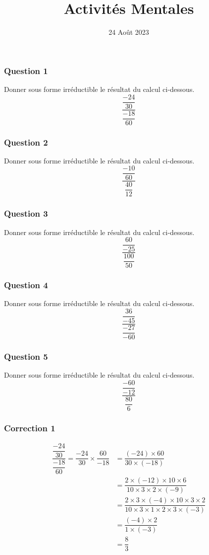 \documentclass[15pt, mathserif]{beamer}
\title{Activités Mentales}
\date{24 Août 2023}
\begin{document}
\begin{frame}
    \titlepage
\end{frame}

\begin{frame} 
	\frametitle{Question 1}
Donner sous forme irréductible le résultat du calcul ci-dessous. \[\dfrac{\dfrac{-24}{30}}{\dfrac{-18}{60}}\]\end{frame}


\begin{frame} 
	\frametitle{Question 2}
Donner sous forme irréductible le résultat du calcul ci-dessous. \[\dfrac{\dfrac{-10}{60}}{\dfrac{40}{12}}\]\end{frame}


\begin{frame} 
	\frametitle{Question 3}
Donner sous forme irréductible le résultat du calcul ci-dessous. \[\dfrac{\dfrac{60}{-25}}{\dfrac{100}{50}}\]\end{frame}


\begin{frame} 
	\frametitle{Question 4}
Donner sous forme irréductible le résultat du calcul ci-dessous. \[\dfrac{\dfrac{36}{-45}}{\dfrac{-27}{-60}}\]\end{frame}


\begin{frame} 
	\frametitle{Question 5}
Donner sous forme irréductible le résultat du calcul ci-dessous. \[\dfrac{\dfrac{-60}{-12}}{\dfrac{80}{6}}\]\end{frame}


\begin{frame}
\vspace{-10mm}
	\frametitle{Correction 1}
	\begin{align*}
	\dfrac{\dfrac{-24}{30}}{\dfrac{-18}{60}}=\dfrac{-24}{30} \times \dfrac{60}{-18}&= \dfrac{\left(-24\right) \times 60}{30 \times \left(-18\right)}\\
		&=\dfrac{2 \times \left(-12\right) \times 10 \times 6}{10 \times 3 \times 2 \times \left(-9\right)}\\		&=\dfrac{2 \times 3 \times \left(-4\right) \times 10 \times 3 \times 2}{10 \times 3 \times 1 \times 2 \times 3 \times \left(-3\right)}\\		&=\dfrac{\left(-4\right) \times 2}{1 \times \left(-3\right)}\\		&=\dfrac{8}{3}
	\end{align*}\end{frame}
\end{document}
